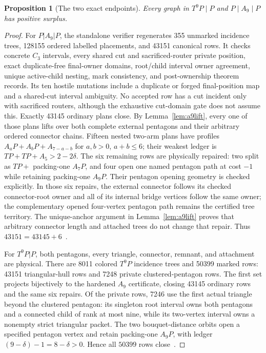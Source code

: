 \documentclass[11pt]{article}
\newtheorem{proposition}[theorem]{Proposition}
\theoremstyle{remark}
\begin{document}
\begin{proposition}[The two exact endpoints]\label{prop:endpoints}
Every graph in $T^9P\mid P$ and $P\mid A_9\mid P$ has positive surplus.
\end{proposition}

\begin{proof}
For $P|A_9|P$, the standalone verifier regenerates 355 unmarked incidence
trees, 128155 ordered labelled placements, and 43151 canonical rows.  It checks
concrete $C_3$ intervals, every shared cut and sacrificed-router private
position, exact duplicate-free final-owner domains, root/child interval owner
agreement, unique active-child nesting, mark consistency, and post-ownership
theorem records.  Its ten hostile mutations include a duplicate or forged
final-position map and a shared-cut interval ambiguity.  No accepted row has a
cut incident only with sacrificed routers, although the exhaustive cut-domain
gate does not assume this.  Exactly 43145 ordinary
plans close.  By
Lemma~\ref{lem:a9lift}, every one of those plans lifts over both complete
external pentagons and their arbitrary ordered connector chains.  Fifteen
nested two-arm plans have profiles
$A_aP+A_bP+A_{7-a-b}$ for $a,b>0$, $a+b\leq6$; their weakest ledger is
$TP+TP+A_5>2-2\delta$.  The six remaining rows are physically repaired: two
split as $TP+$ packing-one $A_7P$, and four open one named pentagon path at cost
$-1$ while retaining packing-one $A_9P$.  Their pentagon opening geometry is
checked explicitly.  In those six repairs, the external connector follows its
checked connector-root owner and all of its internal bridge vertices follow
the same owner; the complementary opened four-vertex pentagon path remains the
certified tree territory.  The unique-anchor argument in
Lemma~\ref{lem:a9lift} proves that arbitrary connector length and attached
trees do not change that repair.  Thus $43151=43145+6$~\cite{A9}.

For $T^9P|P$, both pentagons, every triangle, connector, remnant, and attachment
are physical.  There are 8011 colored $T^9P$ incidence trees and 50399 marked
rows: 43151 triangular-hull rows and 7248 private clustered-pentagon rows.  The
first set projects bijectively to the hardened $A_9$ certificate, closing 43145
ordinary rows and the same six repairs.  Of the private rows, 7246 use the first
actual triangle beyond the clustered pentagon: its singleton root interval owns
both pentagons and a connected child of rank at most nine, while its two-vertex
interval owns a nonempty strict triangular packet.  The two bouquet-distance
orbits open a specified pentagon vertex and retain packing-one $A_9P$, with
ledger $(9-\delta)-1=8-\delta>0$.  Hence all $50399$ rows close~\cite{T9P}.


\end{proof}
\end{document}
